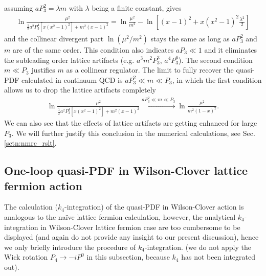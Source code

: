 \documentclass[english,preprint,aps,prd,showpacs,superscriptaddress,nofootinbib,tightenlines]{revtex4}
\begin{document}
assuming $aP_3^2=\lambda m$ with $\lambda$ being a finite constant, gives
\begin{align}
\ln \frac{\mu^2}{\frac{1}{2} a^2P_3^4 \left[x \left(x^2-1\right)^2\right]+m^2 (x-1)^2}=\ln \frac{\mu^2}{m^2}-\ln\left[(x-1)^2+x(x^2-1)^2\frac{\lambda^2}{2}\right]
\end{align}
and the collinear divergent part $\ln \left(\mu^2/m^2\right)$ stays the same as long as $aP_3^2$ and $m$ are of the same order. This condition also indicates $aP_3\ll 1$ and it eliminates the subleading order lattice artifacts (e.g. $a^3 m^2P_3^3$, $a^4P_3^6$).
The second condition $m\ll P_3$ justifies $m$ as a collinear regulator. The limit to fully recover the quasi-PDF calculated in continuum QCD is $aP_3^2\ll m \ll P_3$, in which the first condition allows us to drop the lattice artifacts completely
\begin{align}
\ln \frac{\mu^2}{\frac{1}{2} a^2P_3^4 \left[x \left(x^2-1\right)^2\right]+m^2 (x-1)^2}\overset{aP_3^2\ll m \ll P_3}{\longrightarrow}\ln \frac{\mu^2}{m^2(1-x)^2}.
\end{align}
We can also see that the effects 
of lattice artifacts are getting enhanced for large $P_3$. We will further justify 
this conclusion in the numerical calculations, see Sec.\ref{sctn:nmrc_rslt}.

\subsection{One-loop quasi-PDF in Wilson-Clover lattice fermion action}\label{sec:Oa1}

The calculation ($k_{4}$-integration) of the quasi-PDF in Wilson-Clover action is analogous to the na\"ive lattice fermion calculation, however, the analytical $k_{4}$-integration in Wilson-Clover lattice fermion case are too cumbersome to be displayed (and again do not provide any insight to our present discussion), hence we only briefly introduce the procedure of $k_4$-integration. {(we do not apply the Wick rotation $P_4\rightarrow-iP^0$ in this subsection, because $k_4$ has not  been integrated out)}.
\end{document}
